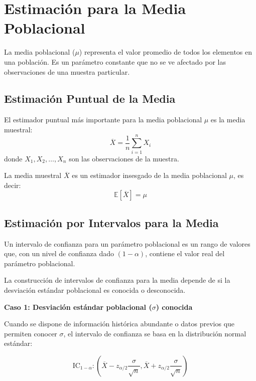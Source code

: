 \section{Estimación para la Media Poblacional}

La media poblacional ($\mu$) representa el valor promedio de todos los elementos en una población. Es un parámetro constante que no se ve afectado por las observaciones de una muestra particular.

\subsection{Estimación Puntual de la Media}

\begin{definition}
El estimador puntual más importante para la media poblacional $\mu$ es la media muestral:
\[
\overline{X} = \frac{1}{n} \sum_{i=1}^n X_i
\]
donde $X_1, X_2, \ldots, X_n$ son las observaciones de la muestra.
\end{definition}

\begin{theorem}
La media muestral $\overline{X}$ es un estimador insesgado de la media poblacional $\mu$, es decir:
\[
\mathbb{E}[\overline{X}] = \mu
\]
\end{theorem}

\subsection{Estimación por Intervalos para la Media}

\begin{definition}
Un intervalo de confianza para un parámetro poblacional es un rango de valores que, con un nivel de confianza dado $(1-\alpha)$, contiene el valor real del parámetro poblacional.
\end{definition}

La construcción de intervalos de confianza para la media depende de si la desviación estándar poblacional es conocida o desconocida.

\textbf{Caso 1: Desviación estándar poblacional ($\sigma$) conocida}

Cuando se dispone de información histórica abundante o datos previos que permiten conocer $\sigma$, el intervalo de confianza se basa en la distribución normal estándar:

\[
\text{IC}_{1-\alpha}: \left( \overline{X} - z_{\alpha/2} \frac{\sigma}{\sqrt{n}}, \overline{X} + z_{\alpha/2} \frac{\sigma}{\sqrt{n}} \right)
\]


